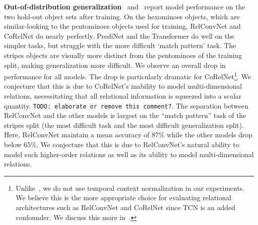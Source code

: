 \textbf{Out-of-distribution generalization}~ and~ report model performance on the two hold-out object sets after training. On the hexominoes objects, which are similar-looking to the pentominoes objects used for training, RelConvNet and CoRelNet do nearly perfectly. PrediNet and the Transformer do well on the simpler tasks, but struggle with the more difficult `match pattern' task. The stripes objects are visually more distinct from the pentominoes of the training split, making generalization more difficult. We observe an overall drop in performance for all models. The drop is particularly dramatic for CoRelNet\footnote{Unlike~\citep{kergNeuralArchitecture2022}, we do not use temporal context normalization in our experiments. We believe this is the more appropriate choice for evaluating relational architectures such as RelConvNet and CoRelNet since TCN is an added confounder. We discuss this more in~.}. We conjecture that this is due to CoRelNet's inability to model multi-dimensional relations, necessitating that all relational information is squeezed into a scalar quantity. \texttt{TODO: elaborate or remove this comment?}. The separation between RelConvNet and the other models is largest on the ``match pattern'' task of the stripes split (the most difficult task and the most difficult generalization split). Here, RelConvNet maintain a mean accuracy of 87\% while the other models drop below 65\%. We conjecture that this is due to RelConvNet's natural ability to model such higher-order relations as well as its ability to model multi-dimensional relations.